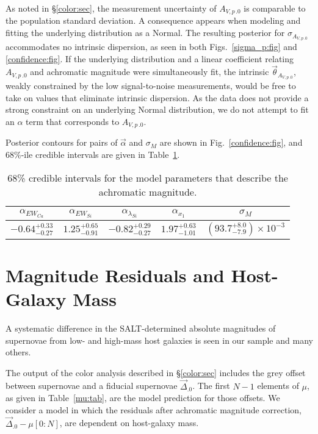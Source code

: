 \documentclass{aastex61}   	%
\begin{document}
As noted in
\S\ref{color:sec}, the measurement uncertainty of ${A_{V,p\,.0}}$ is comparable to the population standard deviation.  A consequence
appears when modeling and fitting
the underlying distribution as a Normal.  The resulting
posterior for  $\sigma_{{A_{V,p\,.0}}}$  accommodates no intrinsic dispersion, as
seen in both Figs.~\ref{sigma_p:fig} and \ref{confidence:fig}.  If the underlying distribution and a linear coefficient relating ${A_{V,p\,.0}}$
and achromatic magnitude were simultaneously fit, the intrinsic  $\vec{\theta}_{A_{V,p\,.0}}$, weakly constrained by the 
low signal-to-noise measurements, would be
free to take on values that eliminate intrinsic dispersion.  As the data does not provide a strong constraint on an underlying Normal distribution,
we do not attempt to fit an $\alpha$ term that corresponds to  ${A_{V,p\,.0}}$.


Posterior contours for pairs  of $\vec{\alpha}$ and
$\sigma_M$ are shown in Fig.~\ref{confidence:fig}, and 68\%-ile credible intervals are given in Table~\ref{magci:tab}.

\begin{table}
    \centering
    \caption{68\% credible intervals for the model parameters that describe the achromatic magnitude.}
    \label{magci:tab}
    \begin{tabular}{ccccc}
        \hline
		 $\alpha_{EW_{Ca}}$ & $\alpha_{EW_{Si}}$ & $\alpha_{\lambda_{Si}}$ & $\alpha_{x_1}$ & $\sigma_M$ \\ 
		\hline
		$-0.64^{+0.33}_{-0.27}$ & $1.25^{+0.65}_{-0.91}$ & $-0.82^{+0.29}_{-0.27}$ & $1.97^{+0.63}_{-1.01}$ & $\left( 93.7^{+8.0}_{-7.9} \right) \times 10^{-3}$ \\ 
		\hline
    \end{tabular}
\end{table}

\section{Magnitude Residuals and Host-Galaxy Mass}

A systematic difference in the SALT-determined absolute magnitudes of supernovae from low- and high-mass host galaxies is seen in
our sample and many others.

The output of the color analysis
described in \S\ref{color:sec} includes the grey offset between supernovae and a fiducial supernovae $\vec{\Delta}_{.0}$.
The first $N-1$ elements of $\mu$, as given in Table~\ref{mu:tab}, are the model prediction for those offsets.
We consider  a model in which the residuals after achromatic magnitude correction, $\vec{\Delta}_{.0} - \mu[0:N]$, are dependent
on host-galaxy mass.
\end{document}
